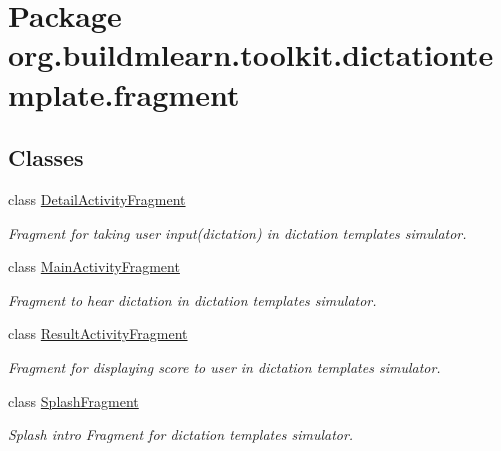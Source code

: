 \hypertarget{namespaceorg_1_1buildmlearn_1_1toolkit_1_1dictationtemplate_1_1fragment}{}\section{Package org.\+buildmlearn.\+toolkit.\+dictationtemplate.\+fragment}
\label{namespaceorg_1_1buildmlearn_1_1toolkit_1_1dictationtemplate_1_1fragment}
\subsection*{Classes}
\begin{DoxyCompactItemize}
\item 
class \hyperlink{classorg_1_1buildmlearn_1_1toolkit_1_1dictationtemplate_1_1fragment_1_1DetailActivityFragment}{Detail\+Activity\+Fragment}
\begin{DoxyCompactList}\small\item\em Fragment for taking user input(dictation) in dictation template\textquotesingle{}s simulator. \end{DoxyCompactList}\item 
class \hyperlink{classorg_1_1buildmlearn_1_1toolkit_1_1dictationtemplate_1_1fragment_1_1MainActivityFragment}{Main\+Activity\+Fragment}
\begin{DoxyCompactList}\small\item\em Fragment to hear dictation in dictation template\textquotesingle{}s simulator. \end{DoxyCompactList}\item 
class \hyperlink{classorg_1_1buildmlearn_1_1toolkit_1_1dictationtemplate_1_1fragment_1_1ResultActivityFragment}{Result\+Activity\+Fragment}
\begin{DoxyCompactList}\small\item\em Fragment for displaying score to user in dictation template\textquotesingle{}s simulator. \end{DoxyCompactList}\item 
class \hyperlink{classorg_1_1buildmlearn_1_1toolkit_1_1dictationtemplate_1_1fragment_1_1SplashFragment}{Splash\+Fragment}
\begin{DoxyCompactList}\small\item\em Splash intro Fragment for dictation template\textquotesingle{}s simulator. \end{DoxyCompactList}\end{DoxyCompactItemize}
